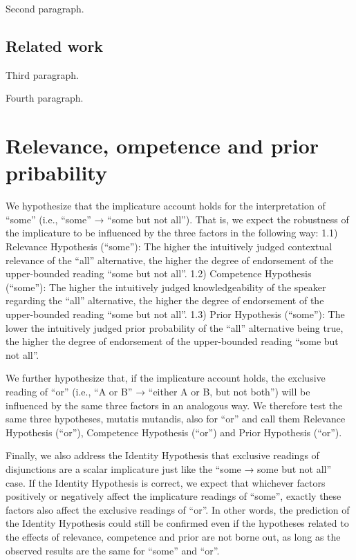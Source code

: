 \documentclass{sp}
\begin{document}
Second paragraph.

\subsection{Related work}

Third paragraph.

Fourth paragraph.

\section{Relevance, ompetence and prior pribability}
We hypothesize that the implicature account holds for the interpretation of “some” (i.e., “some” → “some but not all”). That is, we expect the robustness of the implicature to be influenced by the three factors in the following way: 
1.1) Relevance Hypothesis (“some”): The higher the intuitively judged contextual relevance of the “all” alternative, the higher the degree of endorsement of the upper-bounded reading “some but not all”.  
1.2) Competence Hypothesis (“some”): The higher the intuitively judged knowledgeability of the speaker regarding the “all” alternative, the higher the degree of endorsement of the upper-bounded reading “some but not all”. 
1.3) Prior Hypothesis (“some”): The lower the intuitively judged prior probability of the “all” alternative being true, the higher the degree of endorsement of the upper-bounded reading “some but not all”. 

We further hypothesize that, if the implicature account holds, the exclusive reading of “or” (i.e., “A or B” → “either A or B, but not both”) will be influenced by the same three factors in an analogous way. We therefore test the same three hypotheses, mutatis mutandis, also for “or” and call them Relevance Hypothesis (“or”), Competence Hypothesis (“or”) and Prior Hypothesis (“or”).

Finally, we also address the Identity Hypothesis that exclusive readings of disjunctions are a scalar implicature just like the “some → some but not all” case. If the Identity Hypothesis is correct, we expect that whichever factors positively or negatively affect the implicature readings of “some”, exactly these factors also affect the exclusive readings of “or”. In other words, the prediction of the Identity Hypothesis could still be confirmed even if the hypotheses related to the effects of relevance, competence and prior are not borne out, as long as the observed results are the same for “some” and “or”.
\end{document}
